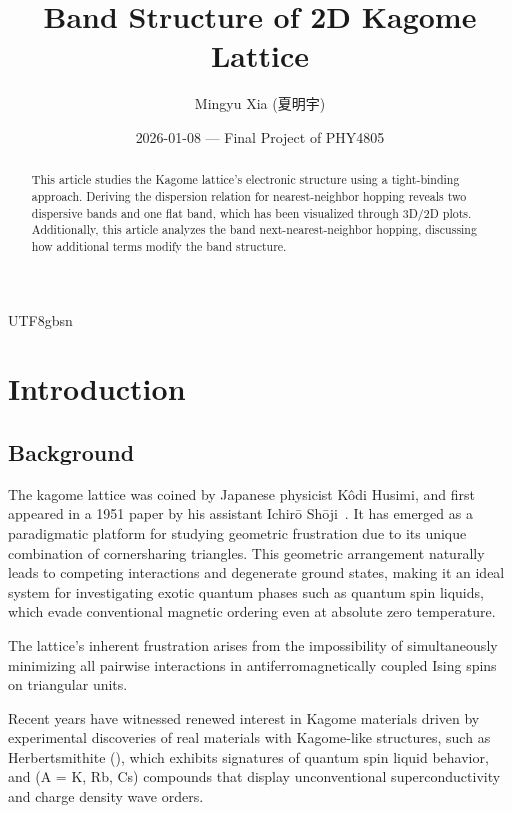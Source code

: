 \documentclass[ preprint, numerical, superscriptaddress, svgnames,
                amssymb, aps, prb ]{revtex4-2}
\renewcommand *\theequation{\arabic{section}.\arabic{equation}}
\begin{document}
\title{Band Structure of 2D Kagome Lattice}
\author{Mingyu Xia (夏明宇)}
\date{2026-01-08 --- Final Project of PHY4805}

\begin{abstract}
  This article studies the Kagome lattice's electronic structure using a
  tight-binding approach. Deriving the dispersion relation for nearest-neighbor
  hopping reveals two dispersive bands and one flat band, which has been
  visualized through 3D/2D plots. Additionally, this article analyzes the band
  next-nearest-neighbor hopping, discussing how additional terms modify the
  band structure.
\end{abstract}

\begin{CJK*}{UTF8}{gbsn}
\maketitle
\end{CJK*}

\section{Introduction}

\subsection{Background}

The kagome lattice was coined by Japanese physicist Kôdi Husimi, and first
appeared in a 1951 paper by his assistant Ichirō Shōji~\cite{WikipediA}.
It has emerged as a paradigmatic platform for studying
geometric frustration due to its unique combination of cornersharing triangles.
This geometric arrangement naturally leads to competing interactions and
degenerate ground states, making it an ideal system for investigating exotic
quantum phases such as quantum spin liquids, which evade conventional magnetic
ordering even at absolute zero temperature.

The lattice's inherent frustration arises from the impossibility of
simultaneously minimizing all pairwise interactions in antiferromagnetically
coupled Ising spins on triangular units.

Recent years have witnessed renewed interest in Kagome materials driven by
experimental discoveries of real materials with Kagome-like structures, such as
Herbertsmithite (), which exhibits signatures of quantum spin
liquid behavior, and  (A = K, Rb, Cs) compounds that display
unconventional superconductivity and charge density wave orders.
\end{document}
